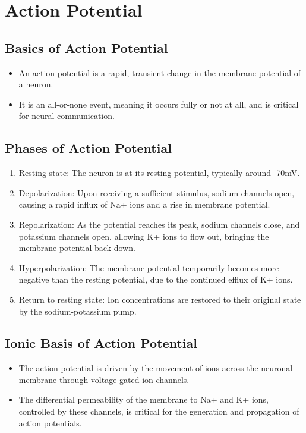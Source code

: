 \documentclass{article}
\begin{document}
\section{Action Potential}

\subsection{Basics of Action Potential}
\begin{itemize}
    \item An action potential is a rapid, transient change in the membrane potential of a neuron.
    \item It is an all-or-none event, meaning it occurs fully or not at all, and is critical for neural communication.
\end{itemize}

\subsection{Phases of Action Potential}
\begin{enumerate}
    \item Resting state: The neuron is at its resting potential, typically around -70mV.
    \item Depolarization: Upon receiving a sufficient stimulus, sodium channels open, causing a rapid influx of Na+ ions and a rise in membrane potential.
    \item Repolarization: As the potential reaches its peak, sodium channels close, and potassium channels open, allowing K+ ions to flow out, bringing the membrane potential back down.
    \item Hyperpolarization: The membrane potential temporarily becomes more negative than the resting potential, due to the continued efflux of K+ ions.
    \item Return to resting state: Ion concentrations are restored to their original state by the sodium-potassium pump.
\end{enumerate}

\subsection{Ionic Basis of Action Potential}
\begin{itemize}
    \item The action potential is driven by the movement of ions across the neuronal membrane through voltage-gated ion channels.
    \item The differential permeability of the membrane to Na+ and K+ ions, controlled by these channels, is critical for the generation and propagation of action potentials.
\end{itemize}
\end{document}
